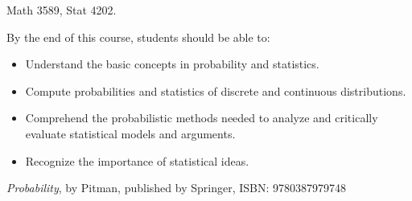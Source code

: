 \documentclass{osucourse}
\begin{document}
\CatalogDescription
\PrerequisitesAndExclusions

\begin{FollowupCourses}
Math 3589, Stat 4202.
\end{FollowupCourses}

\begin{LearningOutcomes}
By the end of this course, students should be able to:

\begin{itemize}
\tightlist
\item
  Understand the basic concepts in probability and statistics.
\item
  Compute probabilities and statistics of discrete and continuous
  distributions.
\item
  Comprehend the probabilistic methods needed to analyze and critically
  evaluate statistical models and arguments.
\item
  Recognize the importance of statistical ideas.
\end{itemize}
\end{LearningOutcomes}

\begin{Text}
\emph{Probability}, by Pitman, published by Springer, ISBN:
9780387979748
\end{Text}
\end{document}
